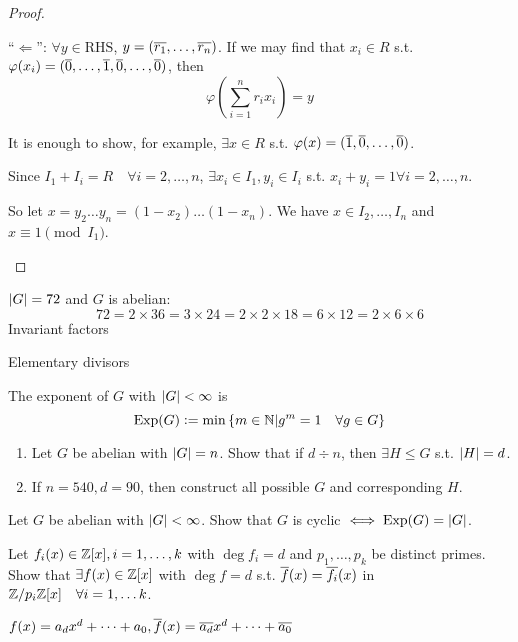 \begin{theorem}
\begin{proof}
\begin{enumerate}[(1)]
        ``$\Leftarrow$'': $\forall y \in \text{RHS}$,
        $y = (\overline{r_1}, \dots, \overline{r_n})$.
        If we may find that $x_i \in R$ s.t.
        $\varphi(x_i) = (\overline{0}, \dots, \overline{1}, \overline{0}, \dots, \overline{0})$,
        then
        \[
          \varphi\left(\sum_{i=1}^n r_ix_i \right) = y
        \]

        It is enough to show, for example, $\exists x \in R$ s.t.
        $\varphi(x) = (\overline{1}, \overline{0}, \dots, \overline{0})$.

        Since $I_1 + I_i = R \quad \forall i = 2, \dots, n$,
        $\exists x_i \in I_1, y_i \in I_i$ s.t. $x_i + y_i = 1
        \forall i = 2, \dots, n$.

        So let $x = y_2\dots y_n = (1-x_2)\dots(1-x_n)$.
        We have $x \in I_2, \dots, I_n$ and $x \equiv 1 \pmod {I_1}$.
    \end{enumerate}
  \end{proof}
\end{theorem}

\begin{example}
  $\lvert G\rvert = 72$ and $G$ is abelian:
  \[
    72 = 2 \times 36 = 3 \times 24 = 2 \times 2 \times 18
    = 6 \times 12 = 2 \times 6 \times 6
  \]
  Invariant factors

  Elementary divisors
\end{example}

\begin{definition}
  The exponent of $G$ with $\lvert G\rvert < \infty$ is
  \[
    \operatorname{Exp}(G) \vcentcolon= \min \left\{
      m \in \mathbb{N} \middle| g^m = 1 \quad \forall g \in G
    \right\}
  \]
\end{definition}

\begin{exercise} \mbox{}
  \begin{enumerate}
    \item Let $G$ be abelian with $\lvert G\rvert = n$. Show that if $d \div n$, then
      $\exists H \le G$ s.t. $\lvert H\rvert = d$.
    \item If $n=540, d=90$, then construct all possible $G$ and
      corresponding $H$.
  \end{enumerate}
\end{exercise}

\begin{exercise}
  Let $G$ be abelian with $\lvert G\rvert < \infty$. Show that $G$ is cyclic
  $\iff \operatorname{Exp}(G) = \lvert G\rvert$.
\end{exercise}

\begin{exercise}
  Let $f_i(x) \in \mathbb{Z}[x], i = 1, \dots, k$ with $\deg f_i = d$ and
  $p_1, \dots, p_k$ be distinct primes.
  Show that $\exists f(x) \in \mathbb{Z}[x]$ with $\deg f = d$ s.t.
  $\overline{f}(x) = \overline{f_i}(x)$ in 
  ${\mathbb{Z}}/{p_i\mathbb{Z}}[x] \quad \forall i = 1, \dots k$.

  $f(x) = a_d x^d + \dots + a_0,
  \overline{f}(x) = \overline{a_d} x^d + \dots + \overline{a_0}$
\end{exercise}
